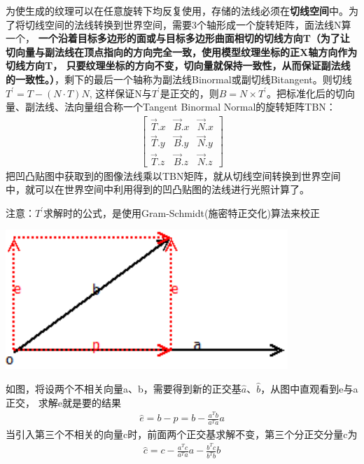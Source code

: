 为使生成的纹理可以在任意旋转下均反复使用，存储的法线必须在\textbf{切线空间}中。为了将切线空间的法线转换到世界空间，需要3个轴形成一个旋转矩阵，面法线N算一个，
\textbf{一个沿着目标多边形的面或与目标多边形曲面相切的切线方向T（为了让切向量与副法线在顶点指向的方向完全一致，使用模型纹理坐标的正X轴方向作为切线方向T，
只要纹理坐标的方向不变，切向量就保持一致性，从而保证副法线的一致性。）}，剩下的最后一个轴称为副法线Binormal或副切线Bitangent。则切线$T^{'} = T - (N \cdot T)N $,
这样保证N与$T^{'}$是正交的，则$B=N \times T^{'}$。把标准化后的切向量、副法线、法向量组合称一个Tangent Binormal Normal的旋转矩阵TBN：
\begin{gather*}
    \begin{bmatrix}
        \overrightarrow{T}.x & \overrightarrow{B}.x & \overrightarrow{N}.x \\ 
        \overrightarrow{T}.y & \overrightarrow{B}.y & \overrightarrow{N}.y \\ 
        \overrightarrow{T}.z & \overrightarrow{B}.z & \overrightarrow{N}.z 
    \end{bmatrix}
\end{gather*}
把凹凸贴图中获取到的图像法线乘以TBN矩阵，就从切线空间转换到世界空间中，就可以在世界空间中利用得到的凹凸贴图的法线进行光照计算了。
\par
注意：$T^{'}$求解时的公式，是使用Gram-Schmidt(施密特正交化)算法来校正
\begin{center}
    \includegraphics[width=0.8\textwidth]{images/gram-schmidt.png}
\end{center}
如图，将设两个不相关向量a、b，需要得到新的正交基$\hat{a}$、$\hat{b}$，从图中直观看到e与a正交，
求解e就是要的结果
\begin{gather*}
    \hat{e} = b - p = b - \frac{a^{T}b}{a^{T}a}a
\end{gather*}
当引入第三个不相关的向量c时，前面两个正交基求解不变，第三个分正交分量c为
\begin{gather*}
    \hat{c} = c - \frac{a^{T}c}{a^{T}a}a - \frac{b^{T}c}{b^{T}b}b
\end{gather*}
